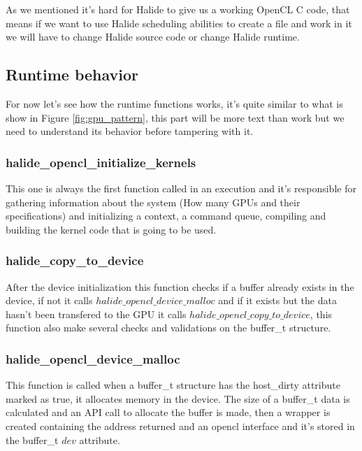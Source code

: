 \documentclass[11pt, a4paper]{article}
\begin{document}
As we mentioned it's hard for Halide to give us a working OpenCL C code,
that means if we want to use Halide scheduling abilities to create a file and
work in it we will have to change Halide source code or change Halide runtime.

\subsection{Runtime behavior}

For now let's see how the runtime functions works, it's quite similar to what is
show in Figure \ref{fig:gpu_pattern}, this part will be more text
than work but we need to understand its behavior before tampering with it.

\subsubsection{halide\_opencl\_initialize\_kernels}

This one is always the first function called in an execution and it's responsible
for gathering information about the system (How many GPUs and their specifications)
and initializing a context, a command queue, compiling and building the
kernel code that is going to be used. 

\subsubsection{halide\_copy\_to\_device}

After the device initialization this function checks if a buffer already exists
in the device, if not it calls $halide\_opencl\_device\_malloc$ and if it exists
but the data hasn't been transfered to the GPU it calls 
$halide\_opencl\_copy\_to\_device$, this function also make several checks and
validations on the buffer\_t structure. 

\subsubsection{halide\_opencl\_device\_malloc}

This function is called when a buffer\_t structure has the host\_dirty attribute
marked as true, it allocates memory in the device. The size of a
buffer\_t data is calculated and an API call to allocate the buffer is made,
then a wrapper is created containing the address returned and an opencl interface
and it's stored in the buffer\_t $dev$ attribute. 
\end{document}
